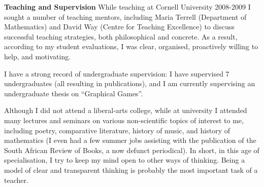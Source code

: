\documentclass[10,a4paper,sans]{moderncv}
\begin{document}
\textbf{Teaching and Supervision}
While teaching at Cornell University 2008-2009 I sought a number of teaching mentors, including Maria Terrell (Department of Mathematics) and David Way (Centre for Teaching Excellence) to discuss successful teaching strategies, both philosophical and concrete. As a result, according to my student evaluations, I was clear, organised, proactively willing to help, and motivating.

I have a strong record of undergraduate supervision: I have supervised 7 undergraduates (all resulting in publications), and I am currently supervising an undergraduate thesis on ``Graphical Games''. 

Although I did not attend a liberal-arts college, while at university I attended many lectures and seminars on various non-scientific topics of interest to me, including poetry, comparative literature, history of music, and history of mathematics (I even had a few summer jobs assisting with the publication of the South African Review of Books, a now defunct periodical). In short, in this age of specialisation, I try to keep my mind open to other ways of thinking. Being a model of clear and transparent thinking is 
probably the most important task of a teacher. 





\end{document}
